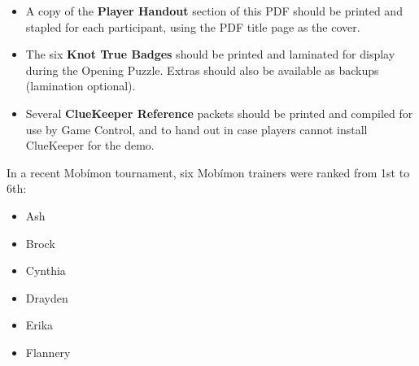\documentclass{puzzlehunt}
\title{\phEventName}
\author{Mathematical Puzzle Programs}
\date{\today}
\begin{document}

\phTitlePage


% 














\begin{itemize}
\item A copy of the \textbf{Player Handout} section of this PDF should
be printed and stapled for each participant, using the PDF title page
as the cover.

\item The six \textbf{Knot True Badges} should be printed and laminated
for display during the Opening Puzzle.
Extras should also be available as backups (lamination optional).

\item Several \textbf{ClueKeeper Reference} packets should be printed
and compiled for use by Game Control, and to hand out in case
players cannot install ClueKeeper for the demo.
\end{itemize}






In a recent Mob\'imon tournament, six Mob\'imon trainers were ranked from 1st to 6th:

\begin{multicols}{3}
\begin{itemize}
\item Ash
\item Brock
\item Cynthia
\item Drayden
\item Erika
\item Flannery
\end{itemize}
\end{multicols}
\end{document}
